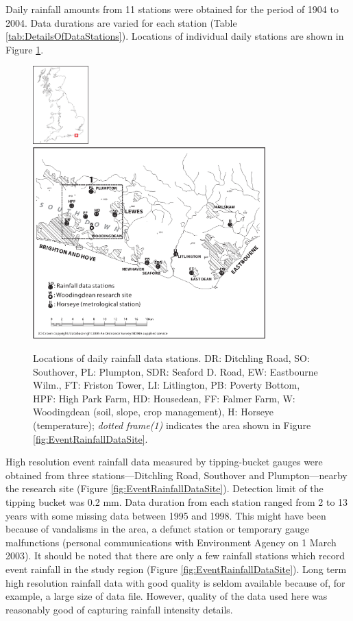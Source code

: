 Daily rainfall amounts from 11 stations were obtained for the period of 1904 to
2004. Data durations are varied for each station (Table
\ref{tab:DetailsOfDataStations}). Locations of individual daily stations are
shown in Figure \ref{fig:DailyRainfallDataSite}.

\begin{figure}[phtb]
  \includegraphics[width=0.19\textwidth]{./img/ukoutline}
  \includegraphics[width=0.8\textwidth]{./img/dailydatasite}
  \caption[Locations of daily rainfall data stations]{Locations of daily
rainfall data stations. DR: Ditchling Road, SO: Southover, PL: Plumpton, SDR:
Seaford D. Road, EW: Eastbourne Wilm., FT: Friston Tower, LI: Litlington, PB:
Poverty Bottom, HPF: High Park Farm, HD: Housedean, FF: Falmer Farm, W:
Woodingdean (soil, slope, crop management), H: Horseye (temperature);
\emph{dotted frame(1)} indicates the area shown in Figure
\ref{fig:EventRainfallDataSite}.}
  \label{fig:DailyRainfallDataSite}
\end{figure}

High resolution event rainfall data measured by tipping-bucket gauges were
obtained from three stations---Ditchling Road, Southover and Plumpton---nearby
the research site (Figure \ref{fig:EventRainfallDataSite}). Detection limit of
the tipping bucket was 0.2 mm. Data duration from each station ranged from 2 to
13 years with some missing data between 1995 and 1998. This might have been
because of vandalisms in the area, a defunct station or temporary gauge
malfunctions (personal communications with Environment Agency on 1 March 2003).
It should be noted that there are only a few rainfall stations which record
event rainfall in the study region (Figure \ref{fig:EventRainfallDataSite}).
Long term high resolution rainfall data with good quality is seldom available
because of, for example, a large size of data file. However, quality of the data
used here was reasonably good of capturing rainfall intensity details.

